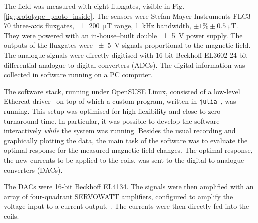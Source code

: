 The field was measured with eight fluxgates, visible in Fig.\,\ref{fig:prototype_photo_inside}.
The sensors were Stefan Mayer Instruments FLC3-70 three-axis fluxgates, \SI{\pm 200}{\micro\tesla} range, \SI{1}{\kilo\hertz} bandwidth, $\pm 1\% \pm \SI{0.5}{\micro\tesla}$.
They were powered with an in-house--built double \SI{\pm 5}{\volt} power supply. The outputs of the fluxgates were \SI{\pm 5}{\volt} signals proportional to the magnetic field.
The analogue signals were directly digitised with 16-bit Beckhoff EL3602 24-bit differential analogue-to-digital converters (ADCs). The digital information was collected in software running on a PC computer.

The software stack, running under OpenSUSE Linux, consisted of a low-level Ethercat driver~\cite{etherlabcode} on top of which a custom program, written in \texttt{julia}~\cite{julia}, was running. This setup was optimised for high flexibility and close-to-zero turnaround time. In particular, it was possible to develop the software interactively \emph{while} the system was running. Besides the usual recording and graphically plotting the data, the main task of the software was to evaluate the optimal response for the measured magnetic field changes. The optimal response, the new currents to be applied to the coils, was sent to the digital-to-analogue converters (DACs).


The DACs were 16-bit Beckhoff EL4134. The signals were then amplified with an array of four-quadrant SERVOWATT amplifiers, configured to amplify the voltage input to a current output. . The currents were then directly fed into the coils.

